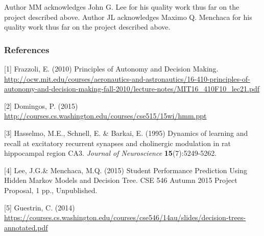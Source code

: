 \documentclass{article} %
\begin{document}
Author MM acknowledges John G. Lee for his quality work thus far on the project described above. Author JL acknowledges Maximo Q. Menchaca for his quality work thus far on the project described above.

\subsubsection*{References}

\small{
[1] Frazzoli, E. (2010) Principles of Autonomy and Decision Making. 
\url{http://ocw.mit.edu/courses/aeronautics-and-astronautics/16-410-principles-of-autonomy-and-decision-making-fall-2010/lecture-notes/MIT16_410F10_lec21.pdf}\label{ref:hmmMIT}

[2] Domingos, P. (2015) \url{ http://courses.cs.washington.edu/courses/cse515/15wi/hmm.ppt}\label{ref:hmmUW}

[3] Hasselmo, M.E., Schnell, E. \& Barkai, E. (1995) Dynamics of learning
and recall at excitatory recurrent synapses and cholinergic modulation
in rat hippocampal region CA3. {\it Journal of Neuroscience}
{\bf 15}(7):5249-5262.
}

[4] Lee, J.G.\& Menchaca, M.Q. (2015) Student Performance Prediction Using Hidden Markov Models and Decision Tree. CSE 546 Autumn 2015 Project Proposal, 1 pp., Unpublished.

[5] Guestrin, C. (2014) \url{ https://courses.cs.washington.edu/courses/cse546/14au/slides/decision-trees-annotated.pdf}
\end{document}
